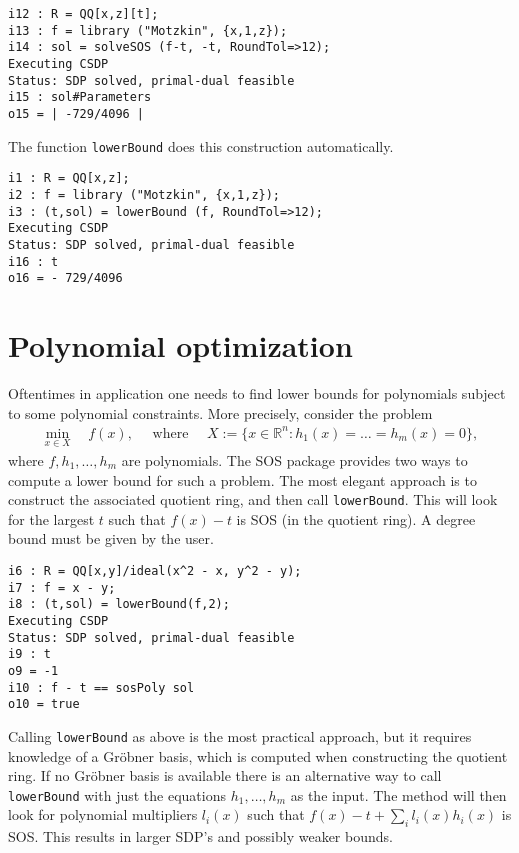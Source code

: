 \documentclass[11pt]{amsart}
\theoremstyle{plain}%
\theoremstyle{definition}
\theoremstyle{remark}
\newcommand{\SOS}{\textsc{SOS}\xspace}
\newcommand{\RR}{\mathbb{R}}
\begin{document}
{\small
\begin{verbatim}
i12 : R = QQ[x,z][t];
i13 : f = library ("Motzkin", {x,1,z});
i14 : sol = solveSOS (f-t, -t, RoundTol=>12);
Executing CSDP
Status: SDP solved, primal-dual feasible
i15 : sol#Parameters
o15 = | -729/4096 |
\end{verbatim}
}

\noindent
The function \verb|lowerBound| does this construction automatically.
{\small
\begin{verbatim}
i1 : R = QQ[x,z];
i2 : f = library ("Motzkin", {x,1,z});
i3 : (t,sol) = lowerBound (f, RoundTol=>12);
Executing CSDP
Status: SDP solved, primal-dual feasible
i16 : t
o16 = - 729/4096
\end{verbatim}
}

\section{Polynomial optimization}

Oftentimes in application one needs to find lower bounds for polynomials subject to some polynomial constraints.
More precisely, consider the problem
\begin{align*}
  \min_{x\in X} \quad f(x),
  \quad \text{ where }\quad
  X := \{x \in \RR^n : h_1(x)=\dots=h_m(x)=0\},
\end{align*}
where $f, h_1,\dots,h_m$ are polynomials.
The \SOS package provides two ways to compute a lower bound for such a problem.
The most elegant approach is to construct the associated quotient ring, and then call \verb|lowerBound|.
This will look for the largest $t$ such that $f(x)-t$ is SOS (in the quotient ring).
A degree bound must be given by the user.

{\small
\begin{verbatim}
i6 : R = QQ[x,y]/ideal(x^2 - x, y^2 - y);
i7 : f = x - y;
i8 : (t,sol) = lowerBound(f,2);
Executing CSDP
Status: SDP solved, primal-dual feasible
i9 : t
o9 = -1
i10 : f - t == sosPoly sol
o10 = true
\end{verbatim}
}

Calling \verb|lowerBound| as above is the most practical approach, but it requires knowledge of a Gröbner basis, which is computed when constructing the quotient ring.
If no Gröbner basis is available there is an alternative way to call \verb|lowerBound| with just the equations $h_1,\dots,h_m$ as the input.
The method will then look for polynomial multipliers $l_i(x)$ such that $f(x) - t + \sum_i l_i(x)h_i(x)$ is SOS.
This results in larger SDP's and possibly weaker bounds.
\end{document}
